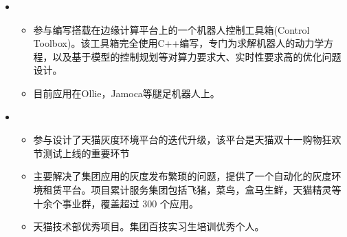 \begin{itemize}[leftmargin=*]
  \item
        {\small
          \begin{itemize}
            \item 参与编写搭载在边缘计算平台上的一个机器人控制工具箱(Control Toolbox)。该工具箱完全使用C++编写，专门为求解机器人的动力学方程，以及基于模型的控制规划等对算力要求大、实时性要求高的优化问题设计。
            \item  目前应用在Ollie，Jamoca等腿足机器人上。
          \end{itemize}
        }
  \item
        {\small
          \begin{itemize}
            \item 参与设计了天猫灰度环境平台的迭代升级，该平台是天猫双十一购物狂欢节测试上线的重要环节
            \item 主要解决了集团应用的灰度发布繁琐的问题，提供了一个自动化的灰度环境租赁平台。项目累计服务集团包括飞猪，菜鸟，盒马生鲜，天猫精灵等十余个事业群，覆盖超过 300 个应用。
            \item 天猫技术部优秀项目。集团百技实习生培训优秀个人。
          \end{itemize}
        }
\end{itemize}